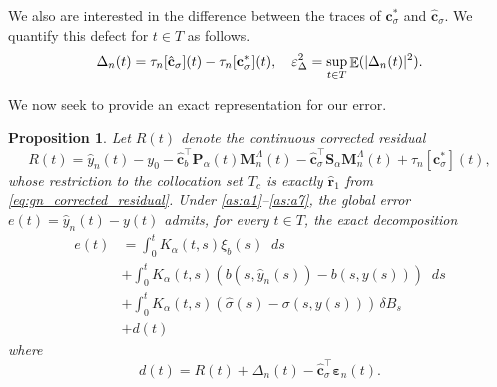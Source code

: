 \documentclass[11pt, a4paper]{article}
\theoremstyle{theoremstyle}
\newtheorem{proposition}[theorem]{Proposition}
\theoremstyle{definitionstyle}
\newcommand{\dd}{\mathop{}\!d}
\DeclareMathOperator{\EE}{\mathbb E}
\DeclarePairedDelimiter{\abs}{\lvert}{\rvert}
\begin{document}
We also are interested in the difference between the traces of $\mathbf c^*_\sigma$ and $\hat{\mathbf c}_\sigma$. We quantify this defect for $t \in T$ as follows.
\begin{equation}\label{eq:trace_defect}
    \Delta_n(t) = \tau_n[\hat{\mathbf c}_\sigma](t) - \tau_n[\mathbf c^*_\sigma](t), \quad \varepsilon^2_\Delta = \sup_{t \in T} \EE (\abs{\Delta_n(t)}^2).
\end{equation}

We now seek to provide an exact representation for our error.
\begin{proposition}\label{prop:error_rep}
    Let $R(t)$ denote the continuous corrected residual
    \begin{equation}\label{eq:corrected_residual}
        R(t) = \hat{y}_n(t) - y_0 - \hat{\mathbf c}_b^\top \mathbf P_\alpha(t) \mathbf M_n^\Lambda(t) - \hat{\mathbf c}_\sigma^\top \mathbf S_\alpha \mathbf M_n^\Lambda(t) + \tau_n[\mathbf c^*_\sigma](t),
    \end{equation}
    whose restriction to the collocation set $T_c$ is exactly $\hat{\mathbf r}_1$ from \eqref{eq:gn_corrected_residual}. Under \ref{as:a1}--\ref{as:a7}, the global error $e(t) = \hat{y}_n(t) - y(t)$ admits, for every $t \in T$, the exact decomposition
    \begin{equation}\label{eq:error_decomposition}
    \begin{aligned}
        e(t) &= \int_0^t K_\alpha(t, s)\xi_b(s)\dd{s} \\
        &+ \int_0^t K_\alpha(t, s)(b(s, \hat{y}_n(s)) - b(s, y(s)))\dd{s} \\
        &+ \int_0^t K_\alpha(t, s)(\hat{\sigma}(s) - \sigma(s, y(s))) \, \delta B_s \\
        &+  d(t)
    \end{aligned}
    \end{equation}
    where
    \begin{equation}\label{eq:defect}
        d(t) = R(t) + \Delta_n(t) - \hat{\mathbf c}_\sigma^\top \boldsymbol \varepsilon_n(t).
    \end{equation}
\end{proposition}
\end{document}
